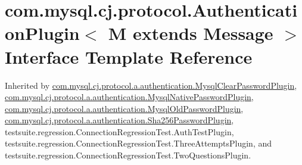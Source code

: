 \hypertarget{interfacecom_1_1mysql_1_1cj_1_1protocol_1_1_authentication_plugin}{}\section{com.\+mysql.\+cj.\+protocol.\+Authentication\+Plugin$<$ M extends Message $>$ Interface Template Reference}
\label{interfacecom_1_1mysql_1_1cj_1_1protocol_1_1_authentication_plugin}


Inherited by \mbox{\hyperlink{classcom_1_1mysql_1_1cj_1_1protocol_1_1a_1_1authentication_1_1_mysql_clear_password_plugin}{com.\+mysql.\+cj.\+protocol.\+a.\+authentication.\+Mysql\+Clear\+Password\+Plugin}}, \mbox{\hyperlink{classcom_1_1mysql_1_1cj_1_1protocol_1_1a_1_1authentication_1_1_mysql_native_password_plugin}{com.\+mysql.\+cj.\+protocol.\+a.\+authentication.\+Mysql\+Native\+Password\+Plugin}}, \mbox{\hyperlink{classcom_1_1mysql_1_1cj_1_1protocol_1_1a_1_1authentication_1_1_mysql_old_password_plugin}{com.\+mysql.\+cj.\+protocol.\+a.\+authentication.\+Mysql\+Old\+Password\+Plugin}}, \mbox{\hyperlink{classcom_1_1mysql_1_1cj_1_1protocol_1_1a_1_1authentication_1_1_sha256_password_plugin}{com.\+mysql.\+cj.\+protocol.\+a.\+authentication.\+Sha256\+Password\+Plugin}}, testsuite.\+regression.\+Connection\+Regression\+Test.\+Auth\+Test\+Plugin, testsuite.\+regression.\+Connection\+Regression\+Test.\+Three\+Attempts\+Plugin, and testsuite.\+regression.\+Connection\+Regression\+Test.\+Two\+Questions\+Plugin.

